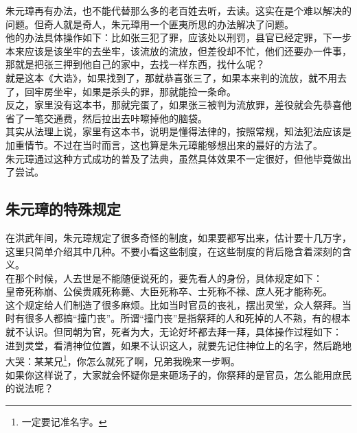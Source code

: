 \begin{multicols}{\theparacolNo}
朱元璋再有办法，也不能代替那么多的老百姓去听，去读。这实在是个难以解决的问题。但奇人就是奇人，朱元璋用一个匪夷所思的办法解决了问题。\\

他的办法具体操作如下：比如张三犯了罪，应该处以刑罚，县官已经定罪，下一步本来应该是该坐牢的去坐牢，该流放的流放，但差役却不忙，他们还要办一件事，那就是把张三押到他自己的家中，去找一样东西，找什么呢？\\

就是这本《大诰》，如果找到了，那就恭喜张三了，如果本来判的流放，就不用去了，回牢房坐牢，如果是杀头的罪，那就能捡一条命。\\

反之，家里没有这本书，那就完蛋了，如果张三被判为流放罪，差役就会先恭喜他省了一笔交通费，然后拉出去咔嚓掉他的脑袋。\\

其实从法理上说，家里有这本书，说明是懂得法律的，按照常规，知法犯法应该是加重情节。不过在当时而言，这也算是朱元璋能够想出来的最好的方法了。\\

朱元璋通过这种方式成功的普及了法典，虽然具体效果不一定很好，但他毕竟做出了尝试。\\

\subsection{朱元璋的特殊规定}
在洪武年间，朱元璋规定了很多奇怪的制度，如果要都写出来，估计要十几万字，这里只简单介绍其中几种。不要小看这些制度，在这些制度的背后隐含着深刻的含义。\\

在那个时候，人去世是不能随便说死的，要先看人的身份，具体规定如下：\\

皇帝死称崩、公侯贵戚死称薨、大臣死称卒、士死称不禄、庶人死才能称死。\\

这个规定给人们制造了很多麻烦。比如当时官员的丧礼，摆出灵堂，众人祭拜。当时有很多人都搞“撞门丧”。所谓“撞门丧”是指祭拜的人和死掉的人不熟，有的根本就不认识。但同朝为官，死者为大，无论好坏都去拜一拜，具体操作过程如下：\\

进到灵堂，看清神位位置，如果不认识这人，就要先记住神位上的名字，然后跪地大哭：某某兄\footnote{一定要记准名字。}，你怎么就死了啊，兄弟我晚来一步啊。\\

如果你这样说了，大家就会怀疑你是来砸场子的，你祭拜的是官员，怎么能用庶民的说法呢？\\


\end{multicols}
